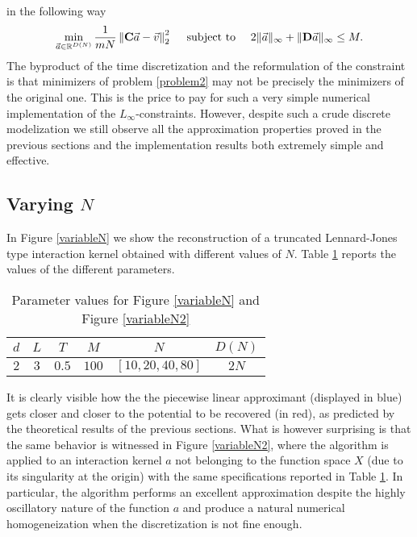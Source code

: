 in the following way
\begin{align}\label{problem2}
\min_{\vec{a} \in \mathbb{R}^{D(N)}} \frac{1}{mN} \left\|\mathbf C \vec{a} - \vec v \right\|^2_{2} \quad \text{ subject to } \quad 2\|\vec{a}\|_{\infty} + \|\mathbf D\vec{a}\|_{\infty} \leq M.
\end{align}
The byproduct of the time discretization and the reformulation of the constraint is that minimizers of problem \eqref{problem2} may not be precisely the minimizers of the original one. This is the price to pay for such a very simple numerical implementation of the $L_\infty$-constraints. However, despite such a crude discrete modelization  we still observe all the approximation properties proved in the previous sections and the implementation results both extremely simple and effective.

\subsection{Varying $N$}

In Figure \ref{variableN} we show the reconstruction of a truncated Lennard-Jones type interaction kernel obtained with different values of $N$. Table \ref{tab:fig1} reports the values of the different parameters.

\begin{table}[h!]%
\begin{center}
\begin{tabular}{ |c|c|c|c|c|c| }
\hline
  $d$ & $L$ & $T$ & $M$ & $N$ & $D(N)$ \\
\hline
\hline
  $2$ & $3$ & $0.5$ & $100$ & $[10,20,40,80]$ & $2N$ \\
\hline
\end{tabular}
\end{center}
\vspace{-0.5cm}
\caption{Parameter values for Figure \ref{variableN} and Figure \ref{variableN2}} \label{tab:fig1} 
\end{table}

It is clearly visible how the the piecewise linear approximant (displayed in blue) gets closer and closer to the potential to be recovered (in red), as predicted by the theoretical results of the previous sections. What is however surprising is that the same behavior is witnessed in Figure \ref{variableN2}, where the algorithm is applied to an interaction kernel $a$ not belonging to the function space $X$ (due to its singularity at the origin) with the same specifications reported in Table \ref{tab:fig1}. In particular, the algorithm performs an excellent approximation despite the highly oscillatory nature of the function $a$ and produce a natural numerical homogeneization when the discretization is not fine enough.

